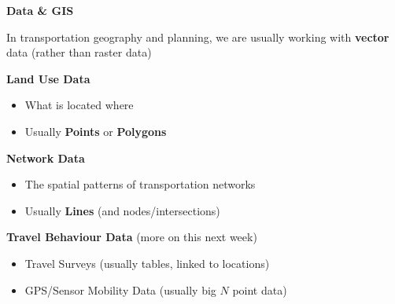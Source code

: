 \documentclass[aspectratio=169]{beamer}
\begin{document}
\begin{frame}
	
	\textbf{Data \& GIS}
	
	\vspace{2mm}
	
	In transportation geography and planning, we are usually working with \textbf{vector} data (rather than raster data)
	
	\vspace{2mm}
	
	\textbf{Land Use Data}
	
	\begin{itemize}
		\item What is located where
		\item Usually \textbf{Points} or \textbf{Polygons}
	\end{itemize}

	\vspace{2mm}
	
	\textbf{Network Data}
	
	\begin{itemize}
		\item The spatial patterns of transportation networks 
		\item Usually \textbf{Lines} (and nodes/intersections)
	\end{itemize}

	\vspace{2mm}

	\textbf{Travel Behaviour Data} (more on this next week)
	
	\begin{itemize}
		
		\item Travel Surveys (usually tables, linked to locations)
		\item GPS/Sensor Mobility Data (usually big $N$ point data)

	\end{itemize}
		
\end{frame}
\end{document}
